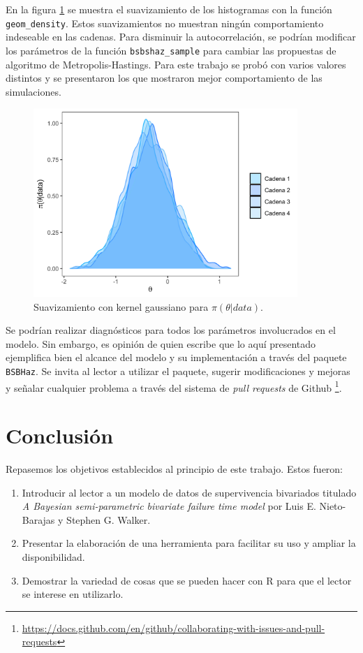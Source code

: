 \documentclass[11pt,a4paper]{article}
\begin{document}
En la figura \ref{fig:theta_densities} se muestra el suavizamiento de los histogramas con la función \texttt{geom\_density}. Estos suavizamientos no muestran ningún comportamiento indeseable en las cadenas. Para disminuir la autocorrelación, se podrían modificar los parámetros de la función \texttt{bsbshaz\_sample} para cambiar las propuestas de algoritmo de Metropolis-Hastings. Para este trabajo se probó con varios valores distintos y se presentaron los que mostraron mejor comportamiento de las simulaciones.\\

\begin{figure}
\centering\includegraphics[width=10cm]{theta_densities.png}
\caption{Suavizamiento con kernel gaussiano para $\pi (\theta | data)$.}
\label{fig:theta_densities}
\end{figure}


Se podrían realizar diagnósticos para todos los parámetros involucrados en el modelo. Sin embargo, es opinión de quien escribe que lo aquí presentado ejemplifica bien el alcance del modelo y su implementación a través del paquete \texttt{BSBHaz}. Se invita al lector a utilizar el paquete, sugerir modificaciones y mejoras y señalar cualquier problema a través del sistema de \textit{pull requests} de Github \footnote{\url{https://docs.github.com/en/github/collaborating-with-issues-and-pull-requests}}.\\

\newpage

\section{Conclusión}

Repasemos los objetivos establecidos al principio de este trabajo. Estos fueron:
\begin{enumerate}
\item Introducir al lector a un modelo de datos de supervivencia bivariados titulado \textit{A Bayesian semi-parametric bivariate failure time model} por Luis E. Nieto-Barajas y Stephen G. Walker.\\
\item Presentar la elaboración de una herramienta para facilitar su uso y ampliar la disponibilidad.\\
\item Demostrar la variedad de cosas que se pueden hacer con R para que el lector se interese en utilizarlo.
\end{enumerate}
\end{document}
